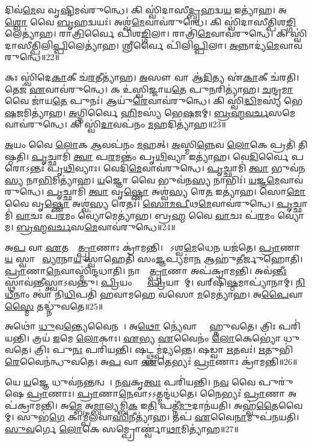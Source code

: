 𑌦𑌿𑌵॑\ul{𑌮𑍇}𑌵 𑌵𑍃\ul{𑌷𑍍𑌟𑌿}𑌮𑌵॑𑌰𑍁𑌨𑍍𑌧𑍇।
𑌕𑌿 𑌸𑍍𑌵𑌿॑𑌦𑌾𑌸𑍀\ul{𑌦𑍍𑌬𑍃}𑌹𑌦𑍍𑌵\ul{𑌯} 𑌇𑌤𑍍𑌯𑌾॑𑌹।
𑌅\ul{𑌶𑍍𑌵𑍋} 𑌵𑍈 \ul{𑌬𑍃}𑌹𑌦𑍍𑌵𑌯𑌃॑।
𑌅𑌶𑍍𑌵॑\ul{𑌮𑍇}𑌵𑌾𑌵॑𑌰𑍁𑌨𑍍𑌧𑍇।
𑌕𑌿 𑌸𑍍𑌵𑌿॑𑌦𑌾𑌸𑍀𑌤𑍍𑌪𑌿𑌶\ul{𑌙𑍍𑌗𑌿}𑌲𑍇𑌤𑍍𑌯𑌾॑𑌹।
𑌰𑌾\ul{𑌤𑍍𑌰𑌿}𑌰𑍍𑌵𑍈 𑌪𑌿॑𑌶\ul{𑌙𑍍𑌗𑌿}𑌲𑌾।
𑌰𑌾𑌤𑍍𑌰𑌿॑\ul{𑌮𑍇}𑌵𑌾𑌵॑𑌰𑍁𑌨𑍍𑌧𑍇।
𑌕𑌿 𑌸𑍍𑌵𑌿॑𑌦𑌾𑌸𑍀𑌤𑍍𑌪𑌿𑌲𑌿\ul{𑌪𑍍𑌪𑌿}𑌲𑍇𑌤𑍍𑌯𑌾॑𑌹।
𑌶𑍍𑌰𑍀𑌰𑍍𑌵𑍈 𑌪𑌿॑𑌲𑌿\ul{𑌪𑍍𑌪𑌿}𑌲𑌾।
\ul{𑌅}𑌨𑍍𑌨𑌾𑌦𑍍𑌯॑\ul{𑌮𑍇}𑌵𑌾𑌵॑𑌰𑍁𑌨𑍍𑌧𑍇॥22॥

𑌕𑌃 𑌸𑍍𑌵𑌿॑𑌦𑍇\ul{𑌕𑌾}𑌕𑍀 𑌚॑\ul{𑌰}𑌤𑍀𑌤𑍍𑌯𑌾॑𑌹।
\ul{𑌅}𑌸𑍗 𑌵𑌾 𑌆॑\ul{𑌦𑌿}𑌤𑍍𑌯 𑌏॑\ul{𑌕𑌾}𑌕𑍀 𑌚॑𑌰𑌤𑌿।
𑌤𑍇𑌜॑ \ul{𑌏}𑌵𑌾𑌵॑𑌰𑍁𑌨𑍍𑌧𑍇।
𑌕 𑌉॑𑌸𑍍𑌵𑌿𑌜𑍍𑌜𑌾𑌯\ul{𑌤𑍇} 𑌪𑍁\ul{𑌨}𑌰𑌿𑌤𑍍𑌯𑌾॑𑌹।
\ul{𑌚}𑌨𑍍𑌦𑍍𑌰\ul{𑌮𑌾} 𑌵𑍈 𑌜𑌾॑𑌯\ul{𑌤𑍇} 𑌪𑍁𑌨𑌃॑।
𑌆𑌯𑍁॑\ul{𑌰𑍇}𑌵𑌾𑌵॑𑌰𑍁𑌨𑍍𑌧𑍇।
𑌕𑌿 𑌸𑍍𑌵𑌿॑\ul{𑌦𑍍𑌧𑌿}𑌮𑌸𑍍𑌯॑ 𑌭𑍇\ul{𑌷}𑌜𑌮𑌿𑌤𑍍𑌯𑌾॑𑌹।
\ul{𑌅}𑌗𑍍𑌨𑌿𑌰𑍍𑌵𑍈 \ul{𑌹𑌿}𑌮𑌸𑍍𑌯॑ 𑌭𑍇\ul{𑌷}𑌜𑌮𑍍।
\ul{𑌬𑍍𑌰}\ul{𑌹𑍍𑌮}\ul{𑌵}\ul{𑌰𑍍𑌚}𑌸𑌮𑍇𑌵𑌾𑌵॑𑌰𑍁𑌨𑍍𑌧𑍇।
𑌕𑌿 𑌸𑍍𑌵𑌿॑\ul{𑌦𑌾}𑌵𑌪॑𑌨𑌂 \ul{𑌮}𑌹𑌦𑌿𑌤𑍍𑌯𑌾॑𑌹॥23॥

\ul{𑌅}𑌯𑌂 𑌵𑍈 \ul{𑌲𑍋}𑌕 \ul{𑌆}𑌵𑌪॑𑌨𑌂 \ul{𑌮}𑌹𑌤𑍍।
\ul{𑌅}𑌸𑍍𑌮𑌿\ul{𑌨𑍍𑌨𑍇}𑌵 \ul{𑌲𑍋}𑌕𑍇 𑌪𑍍𑌰𑌤𑌿॑ 𑌤𑌿𑌷𑍍𑌠𑌤𑌿।
\ul{𑌪𑍃}𑌚𑍍𑌛𑌾𑌮𑌿॑ \ul{𑌤𑍍𑌵𑌾} 𑌪\ul{𑌰}𑌮𑌨𑍍𑌤𑌂॑ 𑌪𑍃\ul{𑌥𑌿}𑌵𑍍𑌯𑌾 𑌇𑌤𑍍𑌯𑌾॑𑌹।
𑌵𑍇\ul{𑌦𑌿}𑌰𑍍𑌵𑍈 𑌪𑌰𑍋\-𑌽𑌨𑍍𑌤𑌃॑ 𑌪𑍃\ul{𑌥𑌿}𑌵𑍍𑌯𑌾𑌃।
𑌵𑍇𑌦𑌿॑\ul{𑌮𑍇}𑌵𑌾𑌵॑𑌰𑍁𑌨𑍍𑌧𑍇।
\ul{𑌪𑍃}𑌚𑍍𑌛𑌾𑌮𑌿॑ \ul{𑌤𑍍𑌵𑌾} 𑌭𑍁𑌵॑𑌨\ul{𑌸𑍍𑌯} 𑌨𑌾\ul{𑌭𑌿}𑌮𑌿𑌤𑍍𑌯𑌾॑𑌹।
\ul{𑌯}𑌜𑍍𑌞𑍋 𑌵𑍈 𑌭𑍁𑌵॑𑌨\ul{𑌸𑍍𑌯} 𑌨𑌾𑌭𑌿𑌃॑।
\ul{𑌯}𑌜𑍍𑌞\ul{𑌮𑍇}𑌵𑌾𑌵॑𑌰𑍁𑌨𑍍𑌧𑍇।
\ul{𑌪𑍃}𑌚𑍍𑌛𑌾𑌮𑌿॑ \ul{𑌤𑍍𑌵𑌾} 𑌵𑍃\ul{𑌷𑍍𑌣𑍋} 𑌅𑌶𑍍𑌵॑\ul{𑌸𑍍𑌯} 𑌰𑍇\ul{𑌤} 𑌇𑌤𑍍𑌯𑌾॑𑌹।
𑌸𑍋\ul{𑌮𑍋} 𑌵𑍈 𑌵𑍃\ul{𑌷𑍍𑌣𑍋} 𑌅𑌶𑍍𑌵॑\ul{𑌸𑍍𑌯} 𑌰𑍇𑌤𑌃॑।
\ul{𑌸𑍋}\ul{𑌮}\ul{𑌪𑍀}𑌥\ul{𑌮𑍇}𑌵𑌾𑌵॑𑌰𑍁𑌨𑍍𑌧𑍇।
\ul{𑌪𑍃}𑌚𑍍𑌛𑌾𑌮𑌿॑ \ul{𑌵𑌾}𑌚𑌃 𑌪॑\ul{𑌰}𑌮𑌂 𑌵𑍍𑌯𑍋॑𑌮𑍇𑌤𑍍𑌯𑌾॑𑌹।
𑌬𑍍𑌰\ul{𑌹𑍍𑌮} 𑌵𑍈 \ul{𑌵𑌾}𑌚𑌃 𑌪॑\ul{𑌰}𑌮𑌂 𑌵𑍍𑌯𑍋॑𑌮।
\ul{𑌬𑍍𑌰}\ul{𑌹𑍍𑌮}\ul{𑌵}\ul{𑌰𑍍𑌚}𑌸\ul{𑌮𑍇}𑌵𑌾𑌵॑𑌰𑍁𑌨𑍍𑌧𑍇॥24॥\anuvakamend[𑌹𑍋𑌤𑌾॑ 𑌭𑌵\ul{𑌤𑌿} 𑌵𑍈 𑌵𑍃𑌷𑍍𑌟𑌿𑌃॑ \ul{𑌪𑍂}𑌰𑍍𑌵𑌚𑌿॑𑌤𑍍𑌤𑌿\ul{𑌰}𑌨𑍍𑌨𑌾𑌦𑍍𑌯॑\ul{𑌮𑍇}𑌵𑌾𑌵॑𑌰𑍁𑌨𑍍𑌧𑍇 \ul{𑌮}𑌹𑌦𑌿𑌤𑍍𑌯𑌾॑\ul{𑌹} 𑌸𑍋\ul{𑌮𑍋} 𑌵𑍈 𑌵𑍃\ul{𑌷𑍍𑌣𑍋} 𑌅𑌶𑍍𑌵॑\ul{𑌸𑍍𑌯} 𑌰𑍇𑌤॑\ul{𑌶𑍍𑌚}𑌤𑍍𑌵𑌾𑌰𑌿॑ 𑌚]

𑌅\ul{𑌪} 𑌵𑌾 \ul{𑌏}𑌤𑌸𑍍𑌮𑌾᳚\ul{𑌤𑍍𑌪𑍍𑌰𑌾}𑌣𑌾𑌃 𑌕𑍍𑌰𑌾॑𑌮𑌨𑍍𑌤𑌿।
𑌯𑍋᳚𑌽𑌶𑍍𑌵\ul{𑌮𑍇}𑌧𑍇\ul{𑌨} 𑌯𑌜॑𑌤𑍇।
\ul{𑌪𑍍𑌰𑌾}𑌣𑌾\ul{𑌯} 𑌸𑍍𑌵𑌾𑌹𑌾᳚ \ul{𑌵𑍍𑌯𑌾}𑌨𑌾\ul{𑌯} 𑌸𑍍𑌵𑌾𑌹𑍇𑌤𑌿॑ 𑌸𑌂\ul{𑌜𑍍𑌞}𑌪𑍍𑌯𑌮𑌾॑\ul{𑌨} 𑌆𑌹𑍁॑𑌤𑍀𑌰𑍍𑌜𑍁𑌹𑍋𑌤𑌿।
\ul{𑌪𑍍𑌰𑌾}𑌣𑌾\ul{𑌨𑍇}𑌵𑌾𑌸𑍍𑌮𑌿॑𑌨𑍍𑌦𑌧𑌾𑌤𑌿।
𑌨𑌾𑌸𑍍𑌮𑌾᳚\ul{𑌤𑍍𑌪𑍍𑌰𑌾}𑌣𑌾 𑌅𑌪॑𑌕𑍍𑌰𑌾𑌮𑌨𑍍𑌤𑌿।
𑌅𑌵॑\ul{𑌨𑍍𑌤𑍀𑌃} 𑌸𑍍𑌥𑌾𑌵॑𑌨𑍍𑌤𑍀𑌸𑍍𑌤𑍍𑌵𑌾\-𑌽𑌵𑌨𑍍𑌤𑍁।
\ul{𑌪𑍍𑌰𑌿}𑌯𑌂 𑌤𑍍𑌵𑌾᳚ \ul{𑌪𑍍𑌰𑌿}𑌯𑌾𑌣𑌾᳚𑌮𑍍।
𑌵𑌰𑍍‌\mbox{}𑌷𑌿॑\ul{𑌷𑍍𑌠}𑌮𑌾𑌪𑍍𑌯𑌾॑𑌨𑌾𑌮𑍍।
\ul{𑌨𑌿}\ul{𑌧𑍀}𑌨𑌾𑌂 𑌤𑍍𑌵𑌾॑ 𑌨𑌿\ul{𑌧𑌿}𑌪𑌤𑌿॑ 𑌹𑌵𑌾𑌮𑌹𑍇 𑌵𑌸𑍋 \ul{𑌮}𑌮𑍇𑌤𑍍𑌯𑌾॑𑌹।
𑌅\ul{𑌪𑍈}𑌵𑌾\ul{𑌸𑍍𑌮𑍈} 𑌤𑌦𑍍𑌧𑍍𑌨𑍁॑𑌵𑌤𑍇॥25॥

𑌅𑌥𑍋॑ \ul{𑌧𑍁}𑌵\ul{𑌨𑍍𑌤𑍍𑌯𑍇}𑌵𑍈𑌨𑌮𑍍᳚।
𑌅\ul{𑌥𑍋} 𑌨𑍍𑌯𑍇॑𑌵𑌾𑌸𑍍𑌮𑍈᳚ 𑌹𑍍𑌨𑍁𑌵𑌤𑍇।
𑌤𑍍𑌰𑌿𑌃 𑌪𑌰𑌿॑𑌯𑌨𑍍𑌤𑌿।
𑌤𑍍𑌰𑌯॑ \ul{𑌇}𑌮𑍇 \ul{𑌲𑍋}𑌕𑌾𑌃।
\ul{𑌏}𑌭𑍍𑌯 \ul{𑌏}𑌵𑍈𑌨𑌂॑ \ul{𑌲𑍋}𑌕𑍇𑌭𑍍𑌯𑍋॑ 𑌧𑍁𑌵𑌤𑍇।
𑌤𑍍𑌰𑌿𑌃 𑌪𑍁\ul{𑌨𑌃} 𑌪𑌰𑌿॑𑌯𑌨𑍍𑌤𑌿।
𑌷𑌟𑍍𑌥𑍍𑌸𑌮𑍍𑌪॑𑌦𑍍𑌯𑌨𑍍𑌤𑍇।
𑌷𑌡𑍍𑌵𑌾 \ul{𑌋}𑌤𑌵𑌃॑।
\ul{𑌋}𑌤𑍁𑌭𑌿॑\ul{𑌰𑍇}𑌵𑍈𑌨॑𑌨𑍍𑌧𑍁𑌵𑌤𑍇।
𑌅\ul{𑌪} 𑌵𑌾 \ul{𑌏}𑌤𑍇𑌭𑍍𑌯𑌃॑ \ul{𑌪𑍍𑌰𑌾}𑌣𑌾𑌃 𑌕𑍍𑌰𑌾॑𑌮𑌨𑍍𑌤𑌿॥26॥

𑌯𑍇 \ul{𑌯}𑌜𑍍𑌞𑍇 𑌧𑍁𑌵॑𑌨\ul{𑌨𑍍𑌤}𑌨𑍍𑌵𑌤𑍇᳚।
\ul{𑌨}\ul{𑌵}𑌕𑍃\ul{𑌤𑍍𑌵𑌃} 𑌪𑌰𑌿॑𑌯𑌨𑍍𑌤𑌿।
𑌨\ul{𑌵} 𑌵𑍈 𑌪𑍁𑌰𑍁॑𑌷𑍇 \ul{𑌪𑍍𑌰𑌾}𑌣𑌾𑌃।
\ul{𑌪𑍍𑌰𑌾}𑌣𑌾\ul{𑌨𑍇}𑌵𑌾𑌽𑌽𑌤𑍍𑌮𑌨𑍍𑌦॑𑌧𑌤𑍇।
𑌨𑍈𑌭𑍍𑌯𑌃॑ \ul{𑌪𑍍𑌰𑌾}𑌣𑌾 𑌅𑌪॑𑌕𑍍𑌰𑌾𑌮𑌨𑍍𑌤𑌿।
𑌅\ul{𑌮𑍍𑌬𑍇} 𑌅\ul{𑌮𑍍𑌬𑌾}𑌲𑍍𑌯𑌮𑍍𑌬𑌿॑\ul{𑌕} 𑌇\ul{𑌤𑌿} 𑌪𑌤𑍍𑌨𑍀॑\ul{𑌮𑍁}𑌦𑌾𑌨॑𑌯𑌤𑌿।
𑌅𑌹𑍍𑌵॑\ul{𑌤𑍈}𑌵𑍈𑌨𑌾᳚𑌮𑍍।
𑌸𑍁𑌭॑\ul{𑌗𑍇} 𑌕𑌾𑌮𑍍𑌪𑍀॑𑌲𑌵𑌾\ul{𑌸𑌿}𑌨𑍀𑌤𑍍𑌯𑌾॑𑌹।
𑌤𑌪॑ \ul{𑌏}𑌵𑍈\ul{𑌨𑌾}𑌮𑍁𑌪॑𑌨𑌯𑌤𑌿।
\ul{𑌸𑍁}\ul{𑌵}𑌰𑍍𑌗𑍇 \ul{𑌲𑍋}𑌕𑍇 𑌸𑌮𑍍𑌪𑍍𑌰𑍋𑌰𑍍𑌣𑍍𑌵𑌾॑\ul{𑌥𑌾}𑌮𑌿𑌤𑍍𑌯𑌾॑𑌹॥27॥

